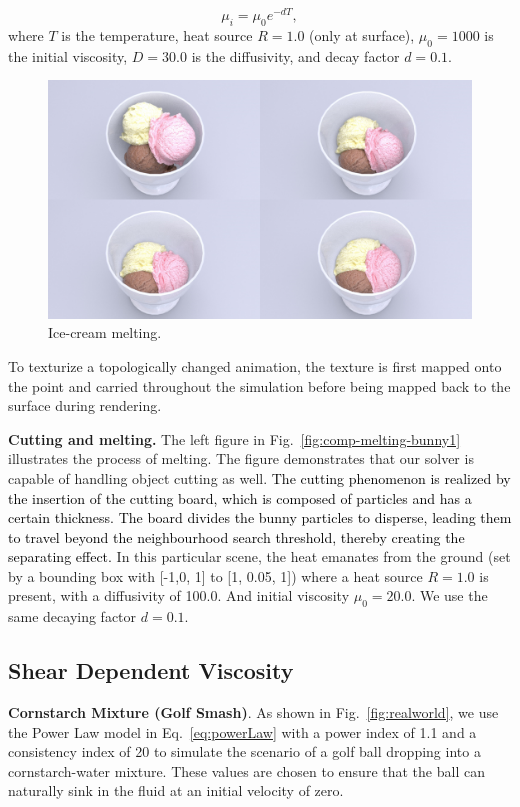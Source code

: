 \documentclass[10pt,journal,compsoc]{IEEEtran}
\newcommand{\revised}[1]{{\textcolor{black}{#1}}}
\begin{document}
\begin{equation}
	\mu_i = \mu_0 e^{-d T},
\end{equation}
where $T$ is the temperature, heat source $R = 1.0$ (only at surface), $\mu_0 = 1000$ is the initial viscosity, $D = 30.0$ is the diffusivity, and decay factor $d= 0.1$.

\begin{figure}[htb]
	\centering
	\includegraphics[width=0.9\linewidth]{pics/ice-cream.png}
	\caption{Ice-cream melting. }     \label{fig:ice-cream}
\end{figure}

To texturize a topologically changed animation, the texture is first mapped onto the point and carried throughout the simulation before being mapped back to the surface during rendering.


\textbf{Cutting and melting.}
The left figure in Fig.~\ref{fig:comp-melting-bunny1} illustrates the process of melting. The figure demonstrates that our solver is capable of handling object cutting as well. \revised{The cutting phenomenon is realized by the insertion of the cutting board, which is composed of particles and has a certain thickness. The board divides the bunny particles to disperse, leading them to travel beyond the neighbourhood search threshold, thereby creating the separating effect.} In this particular scene, the heat emanates from the ground (set by a bounding box with [-1,0, 1] to [1, 0.05, 1]) where a heat source $R=1.0$ is present, with a diffusivity of 100.0. And initial viscosity $\mu_0=20.0$. We use the same decaying factor $d= 0.1$. 


\subsection{Shear Dependent Viscosity}
\textbf{Cornstarch Mixture (Golf Smash)}.
As shown in Fig.~\ref{fig:realworld}, we use the Power Law model in Eq.~\ref{eq:powerLaw} with a power index of 1.1 and a consistency index of 20 to simulate the scenario of a golf ball dropping into a cornstarch-water mixture. These values are chosen to ensure that the ball can naturally sink in the fluid at an initial velocity of zero.
\end{document}
